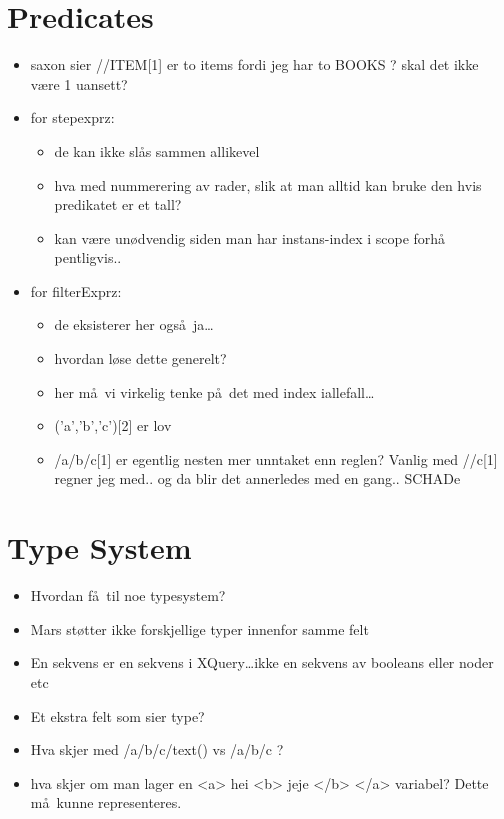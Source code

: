\section{Predicates}
\label{sect:discussion:predicates}
\begin{itemize}
  \item saxon sier //ITEM[1] er to items fordi jeg har to BOOKS ? skal det ikke
  v\ae re 1 uansett?
  \item for stepexprz: 

	\begin{itemize}
	  \item de kan ikke sl\aa s sammen allikevel
	  \item hva med nummerering av rader, slik at man alltid kan bruke den hvis
	  predikatet er et tall?
	  \item kan v\ae re un\o dvendig siden man har instans-index i scope forh\aa
	  pentligvis..
    \end{itemize}
  \item for filterExprz:
  	\begin{itemize}
	  \item de eksisterer her ogs\aa~ja\ldots
	  \item hvordan l\o se dette generelt?
	  \item her m\aa~vi virkelig tenke p\aa~det med index iallefall\ldots 
	  \item ('a','b','c')[2] er lov
	  \item /a/b/c[1] er egentlig nesten mer unntaket enn reglen? Vanlig med
	  //c[1] regner jeg med.. og da blir det annerledes med en gang.. SCHADe
    \end{itemize} 
\end{itemize}

\section{Type System}
\label{sect:discussion:typeSystem}
\begin{itemize}
  \item Hvordan f\aa~til noe typesystem?
  \item Mars st\o tter ikke forskjellige typer innenfor samme felt
  \item En sekvens er en sekvens i XQuery\ldots ikke en sekvens av booleans
  eller noder etc
  \item Et ekstra felt som sier type?
  \item Hva skjer med /a/b/c/text() vs /a/b/c ?
  \item hva skjer om man lager en <a> hei <b> jeje </b> </a> variabel? Dette
  m\aa~kunne representeres.
\end{itemize}

